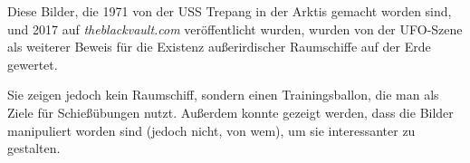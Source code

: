 \documentclass{scrartcl}
\begin{document}
Diese Bilder, die 1971 von der USS Trepang in der Arktis gemacht worden sind, und 2017 auf \textit{theblackvault.com} veröffentlicht wurden, wurden von der UFO-Szene als weiterer Beweis für die Existenz außerirdischer Raumschiffe auf der Erde gewertet.

Sie zeigen jedoch kein Raumschiff, sondern einen Trainingsballon, die man als Ziele für Schießübungen nutzt. Außerdem konnte gezeigt werden, dass die Bilder manipuliert worden sind (jedoch nicht, von wem), um sie interessanter zu gestalten. 
\end{document}
